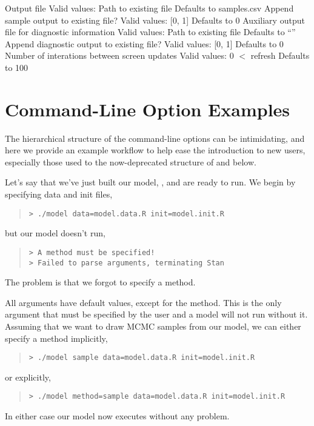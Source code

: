 \begin{description}
%
    {Output file}
    {Valid values: Path to existing file}
    {Defaults to samples.csv}
%
    {Append sample output to existing file?}
    {Valid values: [0, 1]}
    {Defaults to 0}
%
    {Auxiliary output file for diagnostic information}
    {Valid values: Path to existing file}
    {Defaults to ``''}
%
    {Append diagnostic output to existing file?}
    {Valid values: [0, 1]}
    {Defaults to 0}
%
    {Number of interations between screen updates}
    {Valid values: 0 $<$ refresh}
    {Defaults to 100}
%
\end{description}

\section{Command-Line Option Examples}

The hierarchical structure of the command-line options can be intimidating,
and here we provide an example workflow to help ease the introduction to
new users, especially those used to the now-deprecated structure of 
and below.

Let's say that we've just built our model, , and are ready to run.
We begin by specifying data and init files,
%
\begin{quote}
\begin{Verbatim}[fontshape=sl,fontsize=\small]
> ./model data=model.data.R init=model.init.R
\end{Verbatim}
\end{quote}
%
but our model doesn't run,
%
\begin{quote}
\begin{Verbatim}[fontshape=sl,fontsize=\small]
> A method must be specified!
> Failed to parse arguments, terminating Stan
\end{Verbatim}
\end{quote}
%
The problem is that we forgot to specify a method.

All \Stan arguments have default values, except for the method.  This is the
only argument that must be specified by the user and a model will not
run without it.  Assuming that we want to draw MCMC samples from our
model, we can either specify a method implicitly,
%
\begin{quote}
\begin{Verbatim}[fontshape=sl,fontsize=\small]
> ./model sample data=model.data.R init=model.init.R
\end{Verbatim}
\end{quote}
%
or explicitly,
%
\begin{quote}
\begin{Verbatim}[fontshape=sl,fontsize=\small]
> ./model method=sample data=model.data.R init=model.init.R
\end{Verbatim}
\end{quote}
%
In either case our model now executes without any problem.

